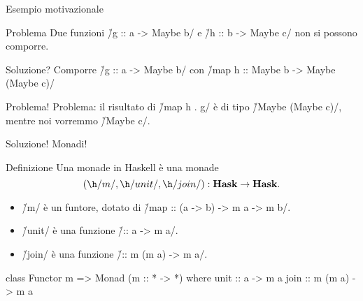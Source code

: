 \begin{frame}[fragile]{\secname}{Esempio motivazionale}
\begin{block}{Problema}
Due funzioni \h/g :: a -> Maybe b/ e \h/h :: b -> Maybe c/ non si possono comporre.
\end{block}
\pause
\begin{block}{Soluzione?}
Comporre \h/g :: a -> Maybe b/ con \h/map h :: Maybe b -> Maybe (Maybe c)/
\end{block}
\pause
\begin{block}{Problema!}
Problema: il risultato di \h/map h . g/ è di tipo \h/Maybe (Maybe c)/, mentre noi vorremmo \h/Maybe c/.
\end{block}
\pause
\begin{block}{Soluzione!}
Monadi!
\end{block}
\end{frame}

\begin{frame}[fragile]{\secname}{Definizione}
Una monade in Haskell è una monade
\[
(\h/m/,\h/unit/,\h/join/):\Hask{}\to\Hask{}.
\]
\vspace{-0.5cm}
\begin{itemize}[<+(1)->]
\item \h/m/ è un funtore, dotato di \h/map :: (a -> b) -> m a -> m b/.
\item \h/unit/ è una funzione \h/:: a -> m a/.
\item \h/join/ è una funzione \h/:: m (m a) -> m a/.
\end{itemize}
\pause

\begin{haskellcode}
class Functor m => Monad (m :: * -> *) where
    unit :: a -> m a
    join :: m (m a) -> m a
\end{haskellcode}
\end{frame}

